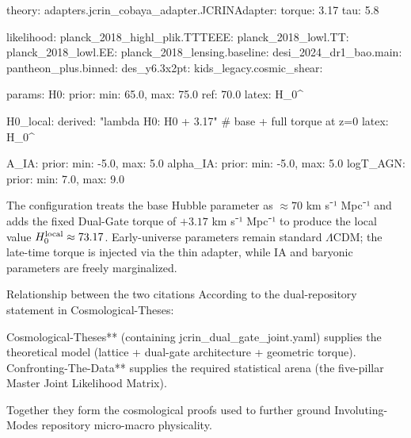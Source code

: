 theory:
  adapters.jcrin_cobaya_adapter.JCRINAdapter:
    torque: 3.17
    tau: 5.8

likelihood:
  planck_2018_highl_plik.TTTEEE:
  planck_2018_lowl.TT:
  planck_2018_lowl.EE:
  planck_2018_lensing.baseline:
  desi_2024_dr1_bao.main:
  pantheon_plus.binned:
  des_y6.3x2pt:
  kids_legacy.cosmic_shear:

params:
  H0:
    prior: {min: 65.0, max: 75.0}
    ref: 70.0
    latex: H_0^

  H0_local:
    derived: "lambda H0: H0 + 3.17"   # base + full torque at z=0
    latex: H_0^

  A_IA:
    prior: {min: -5.0, max: 5.0}
  alpha_IA:
    prior: {min: -5.0, max: 5.0}
  logT_AGN:
    prior: {min: 7.0, max: 9.0}

The configuration treats the base Hubble parameter as \(\approx 70\) km s⁻¹ Mpc⁻¹ and adds the fixed Dual-Gate torque of \(+3.17\) km s⁻¹ Mpc⁻¹ to produce the local value \(H_0^{\rm local}\approx 73.17\). Early-universe parameters remain standard \(\Lambda\)CDM; the late-time torque is injected via the thin adapter, while IA and baryonic parameters are freely marginalized.

Relationship between the two citations 
According to the dual-repository statement in Cosmological-Theses:

Cosmological-Theses** (containing jcrin_dual_gate_joint.yaml) supplies the theoretical model (lattice + dual-gate architecture + geometric torque). 
Confronting-The-Data** supplies the required statistical arena (the five-pillar Master Joint Likelihood Matrix). 

Together they form the cosmological proofs used to further ground Involuting-Modes repository micro-macro physicality. 
